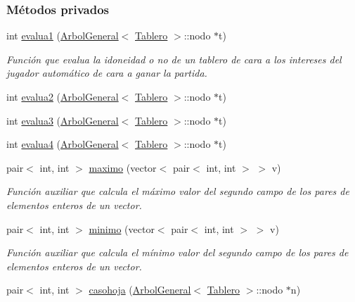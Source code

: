 \subsubsection*{Métodos privados}
\begin{DoxyCompactItemize}
\item 
int \hyperlink{classconecta4_a8026618b8383bd3eda1770d8ef4ec06e}{evalua1} (\hyperlink{classArbolGeneral}{Arbol\-General}$<$ \hyperlink{classTablero}{Tablero} $>$\-::nodo $\ast$t)
\begin{DoxyCompactList}\small\item\em Función que evalua la idoneidad o no de un tablero de cara a los intereses del jugador automático de cara a ganar la partida. \end{DoxyCompactList}\item 
int \hyperlink{classconecta4_a13b6086c29c962d40784657acfcc4b46}{evalua2} (\hyperlink{classArbolGeneral}{Arbol\-General}$<$ \hyperlink{classTablero}{Tablero} $>$\-::nodo $\ast$t)
\item 
int \hyperlink{classconecta4_aac1d8f52d6c71490a042ea4b6d24422d}{evalua3} (\hyperlink{classArbolGeneral}{Arbol\-General}$<$ \hyperlink{classTablero}{Tablero} $>$\-::nodo $\ast$t)
\item 
int \hyperlink{classconecta4_a1ead7236bbcca6da7597902fc0896eda}{evalua4} (\hyperlink{classArbolGeneral}{Arbol\-General}$<$ \hyperlink{classTablero}{Tablero} $>$\-::nodo $\ast$t)
\item 
pair$<$ int, int $>$ \hyperlink{classconecta4_a611b78528b208a7f58b9eaa50266c3cb}{maximo} (vector$<$ pair$<$ int, int $>$ $>$ v)
\begin{DoxyCompactList}\small\item\em Función auxiliar que calcula el máximo valor del segundo campo de los pares de elementos enteros de un vector. \end{DoxyCompactList}\item 
pair$<$ int, int $>$ \hyperlink{classconecta4_a61f4344f9f597a55d89bb19cae1ad2d4}{minimo} (vector$<$ pair$<$ int, int $>$ $>$ v)
\begin{DoxyCompactList}\small\item\em Función auxiliar que calcula el mínimo valor del segundo campo de los pares de elementos enteros de un vector. \end{DoxyCompactList}\item 
pair$<$ int, int $>$ \hyperlink{classconecta4_a3340f1ebb7b854812d9548381135dd4d}{casohoja} (\hyperlink{classArbolGeneral}{Arbol\-General}$<$ \hyperlink{classTablero}{Tablero} $>$\-::nodo $\ast$n)

\end{DoxyCompactItemize}
